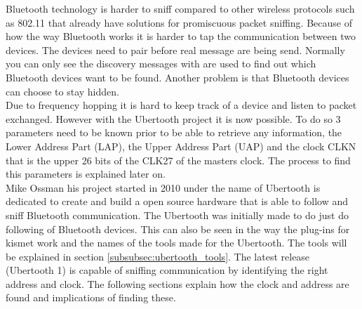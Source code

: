 \label{subsubsec:ubertooth}
Bluetooth technology is harder to sniff compared to other wireless protocols such as 802.11 that already have solutions for promiscuous packet sniffing. Because of how the way Bluetooth works it is harder to tap the communication between two devices. The devices need to pair before real message are being send. Normally you can only see the discovery messages with are used to find out which Bluetooth devices want to be found. Another problem is that Bluetooth devices can choose to stay hidden. \\
Due to frequency hopping it is hard to keep track of a device and listen to packet exchanged. However with the Ubertooth project it is now possible. To do so 3 parameters need to be known prior to be able to retrieve any information, the Lower Address Part (LAP), the Upper Address Part (UAP) and the clock CLKN that is the upper 26 bits of the CLK27 of the masters clock. The process to find this parameters is explained later on.
\\
Mike Ossman his project started in 2010 under the name of Ubertooth is dedicated to create and build a open source hardware that is able to follow and sniff Bluetooth communication. The Ubertooth was initially made to do just do following of Bluetooth devices. This can also be seen in the way the plug-ins for kismet work and the names of the tools made for the Ubertooth. The tools will be explained in section \ref{subsubsec:ubertooth_tools}. The latest release (Ubertooth 1) is capable of sniffing communication by identifying the right address and clock. The following sections explain how the clock and address are found and implications of finding these.

